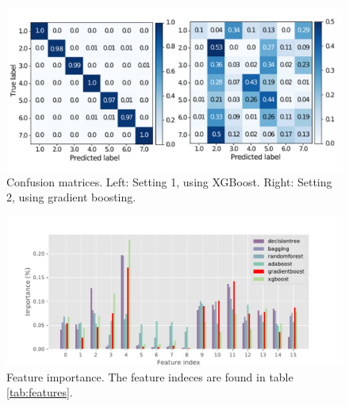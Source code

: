 \begin{figure}
    \centering
    \includegraphics[scale=0.48]{Figures/confusionmatrix_double.pdf}
    \caption{Confusion matrices. Left: Setting 1, using XGBoost. Right: Setting 2, using gradient boosting.}
    \label{fig:confusion_matrix}
\end{figure}

\begin{figure}
    \centering
    \includegraphics[scale=0.7]{Figures/featimp-case1.pdf}
    \caption{Feature importance. The feature indeces are found in table \ref{tab:features}.}
    \label{fig:feature_importance}
\end{figure}


 